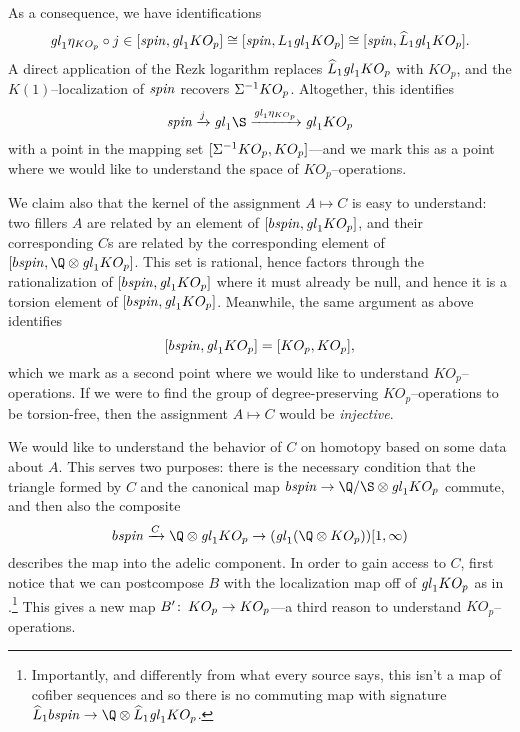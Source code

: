 As a consequence, we have identifications \[\mathit{gl}_1 \eta_{KO_p} \circ j \in [\mathit{spin}, \mathit{gl}_1 KO_p] \cong [\mathit{spin}, L_1 \mathit{gl}_1 KO_p] \cong [\mathit{spin}, \widehat L_1 \mathit{gl}_1 KO_p].\]  A direct application of the Rezk logarithm replaces \(\widehat L_1 \mathit{gl}_1 KO_p\) with \(KO_p\), and the \(K(1)\)--localization of \(\mathit{spin}\) recovers \(\Sigma^{-1} KO_p\).  Altogether, this identifies \[\spin \xrightarrow{j} \gl_1 \S \xrightarrow{\gl_1 \eta_{KO_p}} \gl_1 KO_p\] with a point in the mapping set \([\Sigma^{-1} KO_p, KO_p]\)---and we mark this as a point where we would like to understand the space of \(KO_p\)--operations.

We claim also that the kernel of the assignment \(A \mapsto C\) is easy to understand: two fillers \(A\) are related by an element of \([b\mathit{spin}, \mathit{gl}_1 KO_p]\), and their corresponding \(C\)s are related by the corresponding element of \([b\spin, \Q \otimes \gl_1 KO_p]\).  This set is rational, hence factors through the rationalization of \([b\mathit{spin}, \mathit{gl}_1 KO_p]\) where it must already be null, and hence it is a torsion element of \([b\mathit{spin}, \mathit{gl}_1 KO_p]\).  Meanwhile, the same argument as above identifies \[[b\mathit{spin}, \mathit{gl}_1 KO_p] = [KO_p, KO_p],\] which we mark as a second point where we would like to understand \(KO_p\)--operations.  If we were to find the group of degree-preserving \(KO_p\)--operations to be torsion-free, then the assignment \(A \mapsto C\) would be \emph{injective}.

We would like to understand the behavior of \(C\) on homotopy based on some data about \(A\).  This serves two purposes: there is the necessary condition that the triangle formed by \(C\) and the canonical map \(b\spin \to \Q / \S \otimes \gl_1 KO_p\) commute, and then also the composite \[b\spin \xrightarrow{C} \Q \otimes \gl_1 KO_p \to (\gl_1 (\Q \otimes KO_p))[1, \infty)\] describes the map into the adelic component.  In order to gain access to \(C\), first notice that we can postcompose \(B\) with the localization map off of \(\mathit{gl}_1 KO_p\) as in .\footnote{Importantly, and differently from what every source says, this isn't a map of cofiber sequences and so there is no commuting map with signature \(\widehat L_1 b\spin \to \Q \otimes \widehat L_1 \gl_1 KO_p\).}  This gives a new map \(B'\colon\thinspace KO_p \to KO_p\)---a third reason to understand \(KO_p\)--operations.


